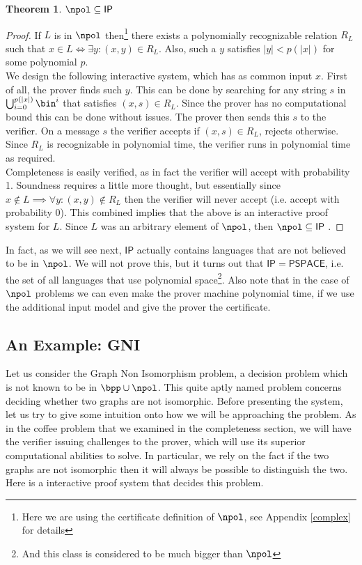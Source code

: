 \documentclass{article}
\newtheorem{theorem}{Theorem}
\begin{document}
\begin{theorem}
    $\npol \subseteq \mathsf{IP}$
\end{theorem}
\begin{proof}
    If $L$ is in $\npol$ then\footnote{Here we are using the certificate definition of $\npol$, see Appendix \ref{complex} for details} there exists a polynomially recognizable relation $R_L$ such that $x \in L \iff \exists y : (x, y) \in R_L$. Also, such a $y$ satisfies $|y| < p(|x|)$ for some polynomial $p$. \\
    We design the following interactive system, which has as common input $x$.
    First of all, the prover finds such $y$. This can be done by searching for any string $s$ in $ \bigcup_{i = 0}^{p(|x|)} \bin^i$ that satisfies $(x, s) \in R_L$. Since the prover has no computational bound this can be done without issues. The prover then sends this $s$ to the verifier. On a message $s$ the verifier accepts if $(x, s) \in R_L$, rejects otherwise. Since $R_L$ is recognizable in polynomial time, the verifier runs in polynomial time as required.  \\
    Completeness is easily verified, as in fact the verifier will accept with probability 1. Soundness requires a little more thought, but essentially since $x \notin L \implies \forall y : (x, y) \notin R_L $ then the verifier will never accept (i.e. accept with probability 0). This combined implies that the above is an interactive proof system for $L$. Since $L$ was an arbitrary element of $\npol$, then $\npol \subseteq \mathsf{IP}$ .
\end{proof}
In fact, as we will see next, $\mathsf{IP}$ actually contains languages that are not believed to be in $\npol$. We will not prove this, but it turns out that $\mathsf{IP} = \mathsf{PSPACE}$, i.e. the set of all languages that use polynomial space\footnote{And this class is considered to be much bigger than $\npol$}. Also note that in the case of $\npol$ problems we can even make the prover machine polynomial time, if we use the additional input model and give the prover the certificate.
\subsection{An Example: GNI}
Let us consider the Graph Non Isomorphism problem, a decision problem which is not known to be in $\bpp \cup \npol$. This quite aptly named problem concerns deciding whether two graphs are not isomorphic.
Before presenting the system, let us try to give some intuition onto how we will be approaching the problem. As in the coffee problem that we examined in the completeness section, we will have the verifier issuing challenges to the prover, which will use its superior computational abilities to solve. In particular, we rely on the fact if the two graphs are not isomorphic then it will always be possible to distinguish the two.
Here is a interactive proof system that decides this problem.
\end{document}
